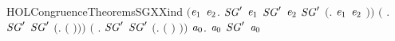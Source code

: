 \begin{SaveVerbatim}{HOLCongruenceTheoremsSGXXind}
       \ensuremath{(}\HOLSymConst{\HOLTokenForall{}}\ensuremath{\HOLBoundVar{e}\sb{\mathrm{1}}} \ensuremath{\HOLBoundVar{e}\sb{\mathrm{2}}}. \ensuremath{\HOLBoundVar{SG}\sp{\prime}} \ensuremath{\HOLBoundVar{e}\sb{\mathrm{1}}} \HOLSymConst{\HOLTokenConj{}} \ensuremath{\HOLBoundVar{SG}\sp{\prime}} \ensuremath{\HOLBoundVar{e}\sb{\mathrm{2}}} \HOLSymConst{\HOLTokenImp{}} \ensuremath{\HOLBoundVar{SG}\sp{\prime}} \ensuremath{(}\HOLTokenLambda{}. \ensuremath{\HOLBoundVar{e}\sb{\mathrm{1}}}  \HOLSymConst{\ensuremath{\mid}} \ensuremath{\HOLBoundVar{e}\sb{\mathrm{2}}} \ensuremath{)}\ensuremath{)} \HOLSymConst{\HOLTokenConj{}}
       \ensuremath{(}\HOLSymConst{\HOLTokenForall{}} . \ensuremath{\HOLBoundVar{SG}\sp{\prime}}  \HOLSymConst{\HOLTokenImp{}} \ensuremath{\HOLBoundVar{SG}\sp{\prime}} \ensuremath{(}\HOLTokenLambda{}.   \ensuremath{(} \ensuremath{)}\ensuremath{)}\ensuremath{)} \HOLSymConst{\HOLTokenConj{}}
       \ensuremath{(}\HOLSymConst{\HOLTokenForall{}} . \ensuremath{\HOLBoundVar{SG}\sp{\prime}}  \HOLSymConst{\HOLTokenImp{}} \ensuremath{\HOLBoundVar{SG}\sp{\prime}} \ensuremath{(}\HOLTokenLambda{}.  \ensuremath{(} \ensuremath{)} \ensuremath{)}\ensuremath{)} \HOLSymConst{\HOLTokenImp{}}
       \HOLSymConst{\HOLTokenForall{}}\ensuremath{\HOLBoundVar{a}\sb{\mathrm{0}}}.  \ensuremath{\HOLBoundVar{a}\sb{\mathrm{0}}} \HOLSymConst{\HOLTokenImp{}} \ensuremath{\HOLBoundVar{SG}\sp{\prime}} \ensuremath{\HOLBoundVar{a}\sb{\mathrm{0}}}
\end{SaveVerbatim}
\newcommand{\HOLCongruenceTheoremsSGXXind}{\UseVerbatim{HOLCongruenceTheoremsSGXXind}}

